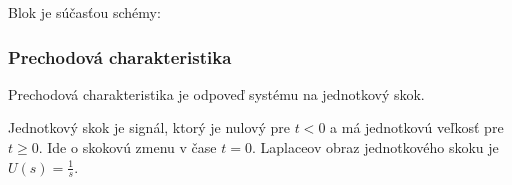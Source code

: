 \documentclass[a4paper, 10pt, ]{article}
\begin{document}
Blok je súčasťou schémy:
\begin{center}


    \vspace{-5mm}

	\label{sim_ICHSS1R}

    \vspace{-1mm}

\end{center}






\subsubsection{Prechodová charakteristika}


Prechodová charakteristika je odpoveď systému na jednotkový skok.

\bigskip

Jednotkový skok je signál, ktorý je nulový pre $t < 0$ a má jednotkovú veľkosť pre $t \geq 0$. Ide o skokovú zmenu v čase $t=0$. Laplaceov obraz jednotkového skoku je $U(s) = \frac{1}{s}$.
\end{document}
